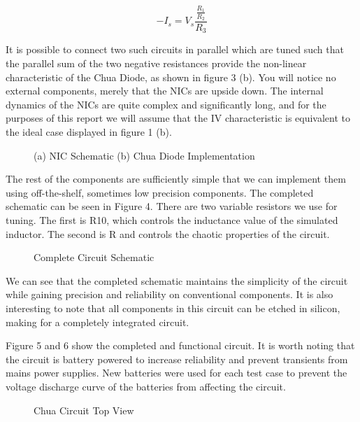 \documentclass[jou,apacite]{apa6}
\begin{document}
\begin{equation}
-I_s = V_s \frac{\frac{R_1}{R_2}}{R_3}
\end{equation}

It is possible to connect two such circuits in parallel which are tuned such that the parallel sum of the two negative resistances provide the non-linear characteristic of the Chua Diode, as shown in figure 3 (b). You will notice no external components, merely that the NICs are upside down. The internal dynamics of the NICs are quite complex and significantly long, and for the purposes of this report we will assume that the IV characteristic is equivalent to the ideal case displayed in figure 1 (b). 

\begin{figure}[H]
\caption{(a) NIC Schematic (b) Chua Diode Implementation}
\endminipage\hfill
{}
\endminipage
\end{figure}

The rest of the components are sufficiently simple that we can implement them using off-the-shelf, sometimes low precision components. The completed schematic can be seen in Figure 4. There are two variable resistors we use for tuning. The first is R10, which controls the inductance value of the simulated inductor. The second is R and controls the chaotic properties of the circuit.

\begin{figure}[H]
\caption{Complete Circuit Schematic}
\end{figure}

We can see that the completed schematic maintains the simplicity of the circuit while gaining precision and reliability on conventional components. It is also interesting to note that all components in this circuit can be etched in silicon, making for a completely integrated circuit. 

Figure 5 and 6 show the completed and functional circuit. It is worth noting that the circuit is battery powered to increase reliability and prevent transients from mains power supplies. New batteries were used for each test case to prevent the voltage discharge curve of the batteries from affecting the circuit.

\begin{figure}[H]
\caption{Chua Circuit Top View}
\end{figure}
\end{document}
